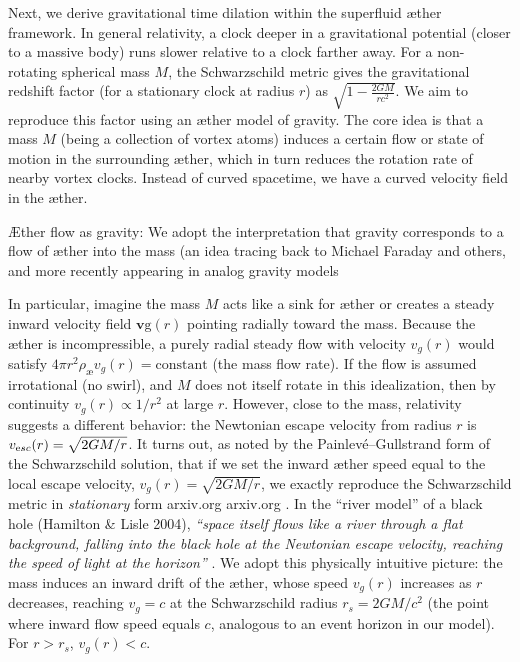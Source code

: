 \documentclass[aps,preprint,superscriptaddress]{revtex4}
\begin{document}
Next, we derive gravitational time dilation within the superfluid æther framework. In general relativity, a clock deeper in a gravitational potential (closer to a massive body) runs slower relative to a clock farther away. For a non-rotating spherical mass $M$, the Schwarzschild metric gives the gravitational redshift factor (for a stationary clock at radius $r$) as $\sqrt{1-\frac{2GM}{r c^2}}$. We aim to reproduce this factor using an æther model of gravity. The core idea is that a mass $M$ (being a collection of vortex atoms) induces a certain flow or state of motion in the surrounding æther, which in turn reduces the rotation rate of nearby vortex clocks. Instead of curved spacetime, we have a curved velocity field in the æther.


Æther flow as gravity: We adopt the interpretation that gravity corresponds to a flow of æther into the mass (an idea tracing back to Michael Faraday and others, and more recently appearing in analog gravity models


In particular, imagine the mass $M$ acts like a sink for æther or creates a steady inward velocity field $\mathbf{v}\text{g}(r)$ pointing radially toward the mass. Because the æther is incompressible, a purely radial steady flow with velocity $v_g(r)$ would satisfy $4\pi r^2 \rho_\text{\ae} v_g(r) = \text{constant}$ (the mass flow rate). If the flow is assumed irrotational (no swirl), and $M$ does not itself rotate in this idealization, then by continuity $v_g(r) \propto 1/r^2$ at large $r$. However, close to the mass, relativity suggests a different behavior: the Newtonian escape velocity from radius $r$ is $v_{\textrm esc}(r) = \sqrt{2GM/r}$. It turns out, as noted by the Painlevé–Gullstrand form of the Schwarzschild solution, that if we set the inward æther speed equal to the local escape velocity, $v_g(r)=\sqrt{2GM/r}$, we exactly reproduce the Schwarzschild metric in \textit{stationary} form arxiv.org
 arxiv.org
. In the “river model” of a black hole (Hamilton & Lisle 2004), \textit{“space itself flows like a river through a flat background, falling into the black hole at the Newtonian escape velocity, reaching the speed of light at the horizon”}
. We adopt this physically intuitive picture: the mass induces an inward drift of the æther, whose speed $v_g(r)$ increases as $r$ decreases, reaching $v_g = c$ at the Schwarzschild radius $r_s = 2GM/c^2$ (the point where inward flow speed equals $c$, analogous to an event horizon in our model). For $r > r_s$, $v_g(r) < c$.
\end{document}
